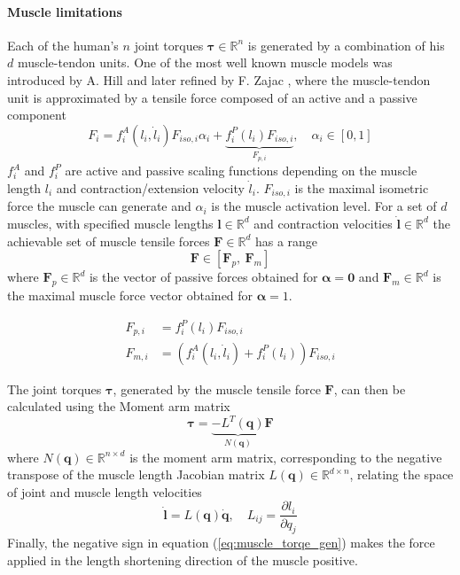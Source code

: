 \paragraph{Muscle limitations} Each of the human's $n$ joint torques $\bm{\tau} \in \mathbb{R}^n$ is generated by a combination of his $d$ muscle-tendon units. One of the most well known muscle models was introduced by A. Hill \cite{hill1938heat} and later refined by F. Zajac \cite{zajac1989muscle}, where the muscle-tendon unit is approximated by a tensile force composed of an active and a passive component
\begin{equation}
    F_i = f^A_i(l_i,\dot{l}_i)F_{iso,i} \alpha_i + \underbrace{f^P_{i}(l_i)F_{iso,i}}_{F_{p,i}}, \quad \alpha_i \in \left[0, 1\right]
\end{equation}
$f^A_{i}$ and $f^P_{i}$ are active and passive scaling functions depending on the muscle length $l_i$ and contraction/extension velocity $\dot{l}_i$. $F_{iso,i}$ is the maximal isometric force the muscle can generate and $\alpha_i$ is the muscle activation level. For a set of $d$ muscles, with specified muscle lengths $\bm{l} \in \mathbb{R}^d$ and contraction velocities $\dot{\bm{l}}\in \mathbb{R}^d$ the achievable set of muscle tensile forces $\bm{F} \in\mathbb{R}^d$ has a range
\begin{equation}
    \bm{F} \in \left[ \bm{F}_{p}, ~ \bm{F}_m\right]
    \label{eq:muslce_initial_range}
\end{equation}
where $\bm{F}_p\in \mathbb{R}^d$ is the vector of passive forces obtained for $\bm{\alpha}\!=\!\bm{0}$ and $\bm{F}_m\in \mathbb{R}^d$ is the maximal muscle force vector obtained for $\bm{\alpha}\!=\!1$. 

\begin{equation}
\begin{aligned}
    F_{p,i} &= f^P_i(l_i)F_{iso,i}\\
    F_{m,i} &= \left(f^A_i(l_i,\dot{l}_i) + f^P_i(l_i)\right)F_{iso,i}
\end{aligned}
\end{equation}

The joint torques $\bm{\tau}$, generated by the muscle tensile force $\bm{F} $, can then be calculated using the Moment arm matrix \cite{pandy1994}   
\begin{equation}
    \bm{\tau} = \underbrace{-L^{T}(\bm{q})}_{N(\bm{q})}\bm{F}
    \label{eq:muscle_torqe_gen}
\end{equation}
where $N(\bm{q})\in \mathbb{R}^{n\times d}$ is the moment arm matrix, corresponding to the negative transpose of the muscle length Jacobian matrix $L(\bm{q})\in \mathbb{R}^{d\times n}$, relating the space of joint and muscle length velocities  
\begin{equation}
    \dot{\bm{l}} = L(\bm{q}) \dot{\bm{q}},\quad L_{ij}=\dfrac{\partial l_i}{\partial q_j}
    \label{eq:muscle_jacobian}
\end{equation}
Finally, the negative sign in equation (\ref{eq:muscle_torqe_gen}) makes the force applied in the length shortening direction of the muscle positive. 

